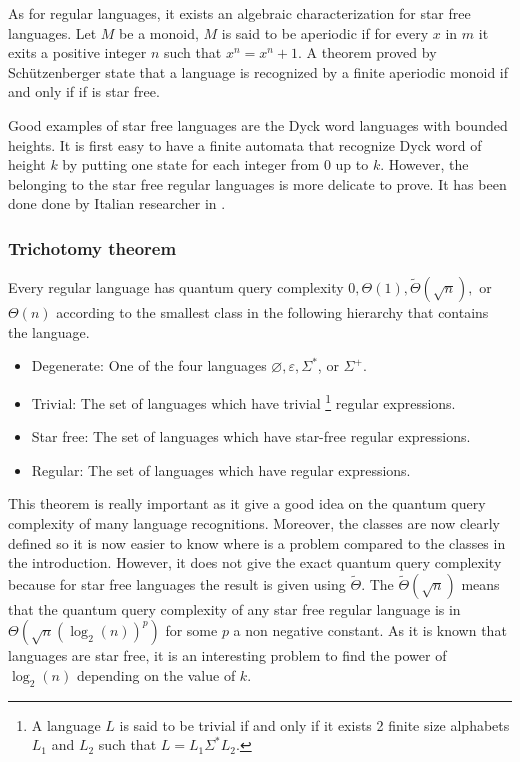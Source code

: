 As for regular languages, it exists an algebraic characterization for star free
languages. Let $M$ be a monoid, $M$ is said to be aperiodic if for every $x$ in
$m$ it exits a positive integer $n$ such that $x^n=x^n+1$. A theorem proved by
Schützenberger \cite{Schtzenberger1965OnFM} state that a language is recognized
by a finite aperiodic monoid if and only if if is star free.

Good examples of star free languages are the Dyck word languages with bounded heights.
It is first easy to have a finite automata that recognize Dyck word of height $k$ by
putting one state for each integer from 0 up to $k$. However, the belonging to the star
free regular languages is more delicate to prove. It has been done done by Italian
researcher in \cite[1978]{dyck_height_bound_star_free}.

\subsubsection{Trichotomy theorem}

\begin{theorem}
    Every regular language has quantum query complexity
    \(0,\Theta(1), \tilde{\Theta}(\sqrt{n}),\) or \(\Theta(n) \)
    according to the smallest class in the following hierarchy that contains
    the language.
    \begin{itemize}
        \item Degenerate: One of the four languages \(\varnothing, \varepsilon, \Sigma^*\), or \(\Sigma^+\).
        \item Trivial: The set of languages which have trivial
              \footnote{A language $L$ is said to be trivial if and only if it exists 2 finite size alphabets
                  $L_1$ and $L_2$ such that $L = L_1 \Sigma^* L_2$.}
              regular expressions.
        \item Star free: The set of languages which have star-free regular expressions.
        \item Regular: The set of languages which have regular expressions.
    \end{itemize}
\end{theorem}

This theorem is really important as it give a good idea on the quantum query complexity
of many language recognitions. Moreover, the classes are now clearly defined so it is now
easier to know where is a problem compared to the classes in the introduction. However,
it does not give the exact quantum query complexity because for star free languages
the result is given using \(\tilde{\Theta}\). The $\tilde{\Theta}(\sqrt{n})$ means that
the quantum query complexity of any star free regular language is in
$\Theta(\sqrt{n}(\log_2(n))^p)$ for some $p$ a non negative constant.
As it is known that  languages are star free, it is an interesting problem
to find the power of $\log_2(n)$ depending on the value of $k$.

